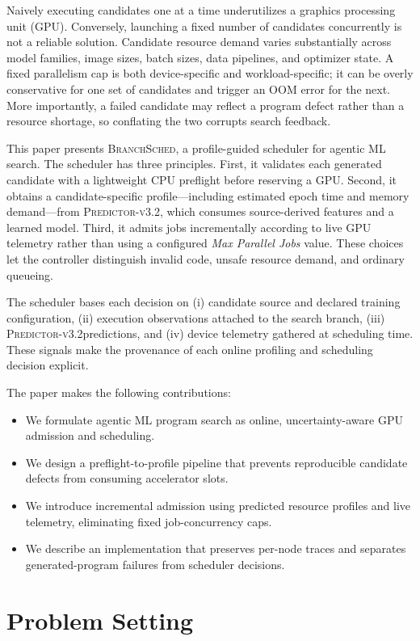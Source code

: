 \documentclass{article}
\newcommand{\method}{\textsc{BranchSched}}
\newcommand{\predictor}{\textsc{Predictor-v3.2}}
\begin{document}
Naively executing candidates one at a time underutilizes a graphics processing unit (GPU). Conversely, launching a fixed number of candidates concurrently is not a reliable solution. Candidate resource demand varies substantially across model families, image sizes, batch sizes, data pipelines, and optimizer state. A fixed parallelism cap is both device-specific and workload-specific; it can be overly conservative for one set of candidates and trigger an OOM error for the next. More importantly, a failed candidate may reflect a program defect rather than a resource shortage, so conflating the two corrupts search feedback.

This paper presents \method, a profile-guided scheduler for agentic ML search. The scheduler has three principles. First, it validates each generated candidate with a lightweight CPU preflight before reserving a GPU. Second, it obtains a candidate-specific profile---including estimated epoch time and memory demand---from \predictor, which consumes source-derived features and a learned model. Third, it admits jobs incrementally according to live GPU telemetry rather than using a configured \emph{Max Parallel Jobs} value. These choices let the controller distinguish invalid code, unsafe resource demand, and ordinary queueing.

The scheduler bases each decision on (i) candidate source and declared training configuration, (ii) execution observations attached to the search branch, (iii) \predictor predictions, and (iv) device telemetry gathered at scheduling time. These signals make the provenance of each online profiling and scheduling decision explicit.

The paper makes the following contributions:
\begin{itemize}
    \item We formulate agentic ML program search as online, uncertainty-aware GPU admission and scheduling.
    \item We design a preflight-to-profile pipeline that prevents reproducible candidate defects from consuming accelerator slots.
    \item We introduce incremental admission using predicted resource profiles and live telemetry, eliminating fixed job-concurrency caps.
    \item We describe an implementation that preserves per-node traces and separates generated-program failures from scheduler decisions.
\end{itemize}

\section{Problem Setting}
\label{sec:problem}
\end{document}
